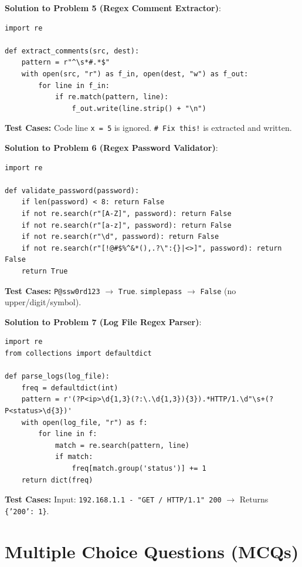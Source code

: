\begin{solutionbox}
\noindent\textbf{Solution to Problem 5 (Regex Comment Extractor)}:
\begin{lstlisting}[language=Python3]
import re

def extract_comments(src, dest):
    pattern = r"^\s*#.*$"
    with open(src, "r") as f_in, open(dest, "w") as f_out:
        for line in f_in:
            if re.match(pattern, line):
                f_out.write(line.strip() + "\n")
\end{lstlisting}
\textbf{Test Cases:} Code line \texttt{x = 5} is ignored. \texttt{\# Fix this!} is extracted and written.

\noindent\textbf{Solution to Problem 6 (Regex Password Validator)}:
\begin{lstlisting}[language=Python3]
import re

def validate_password(password):
    if len(password) < 8: return False
    if not re.search(r"[A-Z]", password): return False
    if not re.search(r"[a-z]", password): return False
    if not re.search(r"\d", password): return False
    if not re.search(r"[!@#$%^&*(),.?\":{}|<>]", password): return False
    return True
\end{lstlisting}
\textbf{Test Cases:} \texttt{P@ssw0rd123} $\to$ \texttt{True}. \texttt{simplepass} $\to$ \texttt{False} (no upper/digit/symbol).

\noindent\textbf{Solution to Problem 7 (Log File Regex Parser)}:
\begin{lstlisting}[language=Python3]
import re
from collections import defaultdict

def parse_logs(log_file):
    freq = defaultdict(int)
    pattern = r'(?P<ip>\d{1,3}(?:\.\d{1,3}){3}).*HTTP/1.\d"\s+(?P<status>\d{3})'
    with open(log_file, "r") as f:
        for line in f:
            match = re.search(pattern, line)
            if match:
                freq[match.group('status')] += 1
    return dict(freq)
\end{lstlisting}
\textbf{Test Cases:} Input: \texttt{192.168.1.1 - "GET / HTTP/1.1" 200} $\to$ Returns \texttt{\{'200': 1\}}.
\end{solutionbox}

\section{Multiple Choice Questions (MCQs)}

